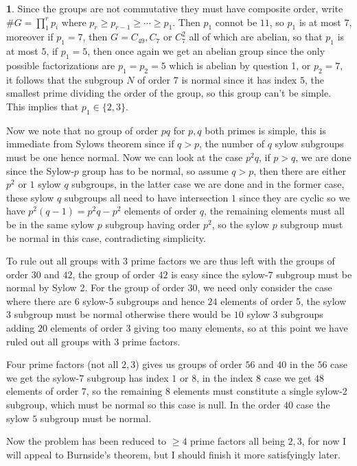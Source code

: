\documentclass[10.5pt]{article}
\theoremstyle{definition}
\newtheorem{pb}{}
\newcommand{\set}[1]{\{#1\}}
\newcommand{\tor}{\text{ or }}
\begin{document}
    \begin{pb}
        Since the groups are not commutative they must have composite order, write \(\#G = \prod_1^r p_i\) where \(p_r \geq p_{r-1} \geq \cdots \geq p_1\). Then \(p_1\) connot be \(11\), so \(p_1\) is at most \(7\), moreover if \(p_1 = 7\), then \(G = C_{49}, C_{7} \tor C_7^2\) all of which are abelian, so that \(p_1\) is at most \(5\), if \(p_1 = 5\), then once again we get an abelian group since the only possible factorizations are \(p_1 = p_2 = 5\) which is abelian by question 1, or \(p_2 = 7\), it follows that the subgroup \(N\) of order \(7\) is normal since it has index \(5\), the smallest prime dividing the order of the group, so this group can't be simple. This implies that \(p_1 \in \set{2,3}\).

        Now we note that no group of order \(pq\) for \(p,q\) both primes is simple, this is immediate from Sylows theorem since if \(q > p\), the number of \(q\) sylow subgroups must be one hence normal. Now we can look at the case \(p^2q\), if \(p > q\), we are done since the Sylow-\(p\) group has to be normal, so assume \(q > p\), then there are either \(p^2\) or \(1\) sylow \(q\) subgroups, in the latter case we are done and in the former case, these sylow \(q\) subgroups all need to have intersection \(1\) since they are cyclic so we have \(p^2(q-1) = p^2q - p^2\) elements of order \(q\), the remaining elements must all be in the same sylow \(p\) subgroup having order \(p^2\), so the sylow \(p\) subgroup must be normal in this case, contradicting simplicity.

        To rule out all groups with 3 prime factors we are thus left with the groups of order \(30\) and \(42\), the group of order \(42\) is easy since the sylow-\(7\) subgroup must be normal by Sylow 2. For the group of order 30, we need only consider the case where there are \(6\) sylow-5 subgroups and hence \(24\) elements of order 5, the sylow \(3\) subgroup must be normal otherwise there would be \(10\) sylow 3 subgroups adding \(20\) elements of order \(3\) giving too many elements, so at this point we have ruled out all groups with \(3\) prime factors.

        Four prime factors (not all \(2,3\)) gives us groups of order \(56\) and \(40\) in the \(56\) case we get the sylow-7 subgroup has index \(1\) or \(8\), in the index \(8\) case we get \(48\) elements of order \(7\), so the remaining \(8\) elements must constitute a single sylow-2 subgroup, which must be normal so this case is null. In the order \(40\) case the sylow \(5\) subgroup must be normal.

        Now the problem has been reduced to \(\geq 4\) prime factors all being \(2,3\), for now I will appeal to Burnside's theorem, but I should finish it more satisfyingly later.
    \end{pb}
\end{document}
